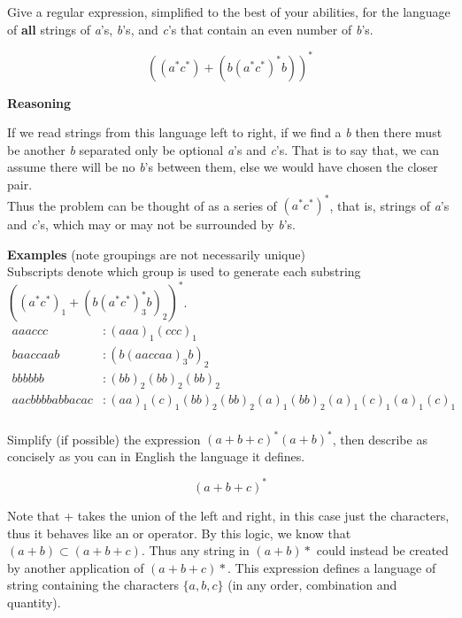 \documentclass[12pt]{jhwhw}
\begin{document}
\problem{}

	Give a regular expression, simplified to the best of your abilities, for the language of \textbf{all} strings
	of \textit{a}'s, \textit{b}'s, and \textit{c}'s that contain an even number of \textit{b}'s.

\solution

	$$
		((a^*c^*)+(b(a^*c^*)^*b))^*
	$$

	\textbf{Reasoning}

	If we read strings from this language left to right, if we find a \textit{b} then there must be another \textit{b}
	separated only be optional \textit{a}'s and \textit{c}'s. That is to say that, we can assume there will be 
	no \textit{b}'s between them, else we would have chosen the closer pair.
	\\
	Thus the problem can be thought of as a series of $(a^*c^*)^*$, that is, strings of \textit{a}'s and
	\textit{c}'s, which may or may not be surrounded by \textit{b}'s.

	\bigbreak
	\textbf{Examples} (note groupings are not necessarily unique) \\
	Subscripts denote which group is used to generate each substring $((a^*c^*)_1+(b(a^*c^*)_3^*b)_2)^*$. \\
	\begin{align*}
		aaaccc &: 
			(aaa)_1(ccc)_1 \\
		baaccaab &: 
			(b(aaccaa)_3b)_2 \\
		bbbbbb &: 
			(bb)_2(bb)_2(bb)_2 \\
		aacbbbbabbacac &: 
			(aa)_1(c)_1(bb)_2(bb)_2(a)_1(bb)_2(a)_1(c)_1(a)_1(c)_1 \\
	\end{align*}

\problem{}

	Simplify (if possible) the expression $(a+b+c)^*(a+b)^*$, then describe as concisely as you can
	in English the language it defines.

\solution

	$$
		(a+b+c)^*
	$$

	Note that + takes the union of the left and right, in this case just the characters, 
	thus it behaves like an or operator.
	By this logic, we know that $(a+b) \subset (a+b+c)$.
	Thus any string in $(a+b)*$ could instead be created by another application of $(a+b+c)*$.
	\bigbreak
	This expression defines a language of string containing the characters $\{a,b,c\}$ (in any order, combination
	and quantity).
\end{document}
